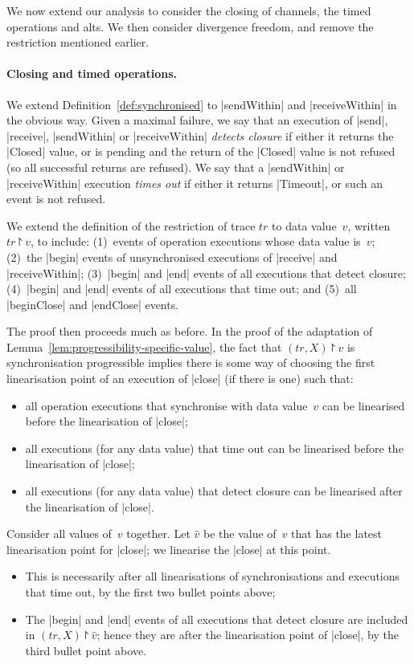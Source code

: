 We now extend our analysis to consider the closing of channels, the timed
operations and alts.  We then consider divergence freedom, and remove the
restriction mentioned earlier.


\paragraph{Closing and timed operations.}

We extend Definition~\ref{def:synchronised} to |sendWithin| and
|receiveWithin| in the obvious way.  Given a maximal failure, we say that an
execution of |send|, |receive|, |sendWithin| or |receiveWithin| \emph{detects
  closure} if either it returns the |Closed| value, or is pending and the
return of the |Closed| value is not refused (so all successful returns are
refused).  We say that a |sendWithin| or |receiveWithin| execution
\emph{times out} if either it returns |Timeout|, or such an event is not
refused.

We extend the definition of the restriction of trace $tr$ to data value~$v$,
written $tr \project v$, to include: (1)~events of operation executions whose
data value is~$v$; (2)~the |begin| events of unsynchronised executions of
|receive| and |receiveWithin|; (3)~|begin| and |end| events of all executions
that detect closure; (4)~|begin| and |end| events of all executions that time
out; and (5)~all |beginClose| and |endClose| events.

The proof then proceeds much as before.  In the proof of the adaptation of
Lemma~\ref{lem:progressibility-specific-value}, the fact that $(tr,X) \project
v$ is synchronisation progressible implies there is some way of choosing the
first linearisation point of an execution of |close| (if there is one) such
that:
%
\begin{itemize}
\item all operation executions that synchronise with data value~$v$ can be
  linearised before the linearisation of |close|;

\item all executions (for any data value) that time out can be linearised
  before the linearisation of |close|;

\item all executions (for any data value) that detect closure can be
  linearised after the linearisation of |close|.
\end{itemize}
%
Consider all values of~$v$ together.  Let $\hat{v}$ be the value of~$v$ that
has the latest linearisation point for |close|; we linearise the |close| at
this point.
%
\begin{itemize}
\item This is necessarily after all linearisations of synchronisations and
  executions that time out, by the first two bullet points above;

\item The |begin| and |end| events of all executions that detect closure are
  included in $(tr,X) \project \hat{v}$; hence they are after the 
  linearisation point of |close|, by the third bullet point above.
\end{itemize}

